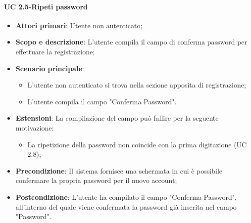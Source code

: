                 \paragraph{UC 2.5-Ripeti password}
                \begin{itemize}
                \item \textbf{Attori primari}: Utente non autenticato;
                
                \item \textbf{Scopo e descrizione}: L'utente compila il campo di conferma password per effettuare la registrazione; 
                \item \textbf{Scenario principale}: 
                    \begin{itemize}
                        \item L'utente non autenticato si trova nella sezione apposita di registrazione;
                        \item L'utente compila il campo "Conferma Password".
                    \end{itemize}
                \item \textbf{Estensioni}:  La compilazione del campo può fallire per la seguente motivazione:
                    \begin{itemize}
                        \item La ripetizione della password non coincide con la prima digitazione (UC 2.8);
                    \end{itemize}
                
                \item \textbf{Precondizione}: Il sistema fornisce una schermata in cui è possibile confermare la propria               password per il nuovo account;
                \item \textbf{Postcondizione}: L'utente ha compilato il campo "Conferma Password", all'interno del quale viene confermata la password già inserita nel campo "Password".
                \end{itemize}
                
                
